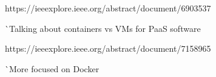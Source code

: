 https://ieeexplore.ieee.org/abstract/document/6903537

^^ Talking about containers vs VMs for PaaS software

https://ieeexplore.ieee.org/abstract/document/7158965

^^ More focused on Docker

\pagebreak

